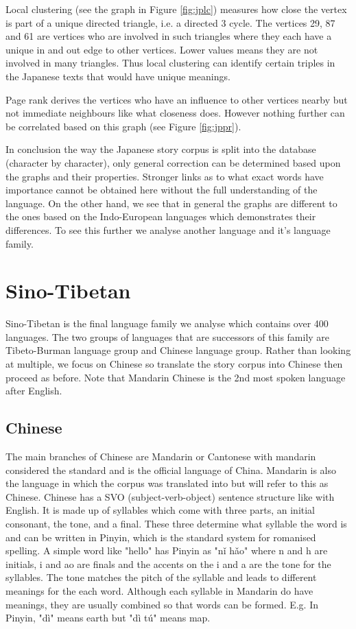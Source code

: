 Local clustering (see the graph in Figure \ref{fig:jplc}) measures how close the vertex is part of a unique directed triangle, i.e. a directed 3 cycle. The vertices 29, 87 and 61 are vertices who are involved in such triangles where they each have a unique in and out edge to other vertices. Lower values means they are not involved in many triangles. Thus local clustering can identify certain triples in the Japanese texts that would have unique meanings. 

Page rank derives the vertices who have an influence to other vertices nearby but not immediate neighbours like what closeness does. However nothing further can be correlated based on this graph (see Figure \ref{fig:jppr}).

In conclusion the way the Japanese story corpus is split into the database (character by character), only general correction can be determined based upon the graphs and their properties. Stronger links as to what exact words have importance cannot be obtained here without the full understanding of the language. On the other hand, we see that in general the graphs are different to the ones based on the Indo-European languages which demonstrates their differences. To see this further we analyse another language and it's language family.

\section{Sino-Tibetan}
Sino-Tibetan is the final language family we analyse which contains over 400 languages. The two groups of languages that are successors of this family are Tibeto-Burman language group and Chinese language group. Rather than looking at multiple, we focus on Chinese so translate the story corpus into Chinese then proceed as before. Note that Mandarin Chinese is the 2nd most spoken language after English.

\subsection{Chinese}
The main branches of Chinese are Mandarin or Cantonese with mandarin considered the standard and is the official language of China. Mandarin is also the language in which the corpus was translated into but will refer to this as Chinese. Chinese has a SVO (subject-verb-object) sentence structure like with English. It is made up of syllables\cite{ross2017modern} which come with three parts, an initial consonant, the tone, and a final. These three determine what syllable the word is and can be written in Pinyin, which is the standard system for romanised spelling. A simple word like "hello" has Pinyin as "nǐ hǎo" where n and h are initials, i and ao are finals and the accents on the i and a are the tone for the syllables. The tone matches the pitch of the syllable and leads to different meanings for the each word. Although each syllable in Mandarin do have meanings, they are usually combined so that words can be formed. E.g. In Pinyin, "dì" means earth but "dì tú" means map.

